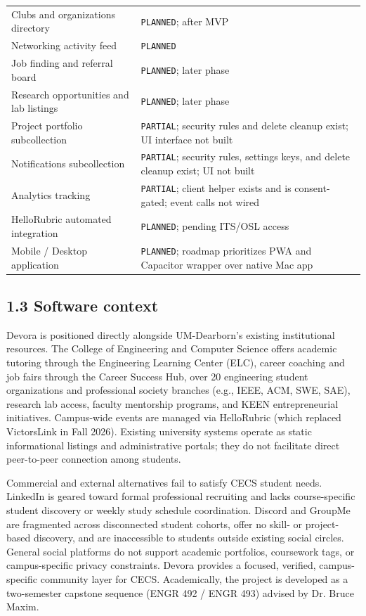 \documentclass[11pt,letterpaper]{article}
\begin{document}
\begin{table}[h!]
\begin{tabularx}{\textwidth}{l Y}
Clubs and organizations directory & \texttt{PLANNED}; after MVP \\
Networking activity feed & \texttt{PLANNED} \\
Job finding and referral board & \texttt{PLANNED}; later phase \\
Research opportunities and lab listings & \texttt{PLANNED}; later phase \\
Project portfolio subcollection & \texttt{PARTIAL}; security rules and delete cleanup exist; UI interface not built \\
Notifications subcollection & \texttt{PARTIAL}; security rules, settings keys, and delete cleanup exist; UI not built \\
Analytics tracking & \texttt{PARTIAL}; client helper exists and is consent-gated; event calls not wired \\
HelloRubric automated integration & \texttt{PLANNED}; pending ITS/OSL access \\
Mobile / Desktop application & \texttt{PLANNED}; roadmap prioritizes PWA and Capacitor wrapper over native Mac app \\
\bottomrule
\end{tabularx}
\end{table}

\subsection*{1.3 Software context}

Devora is positioned directly alongside UM-Dearborn's existing institutional resources. The College of Engineering and Computer Science offers academic tutoring through the Engineering Learning Center (ELC), career coaching and job fairs through the Career Success Hub, over 20 engineering student organizations and professional society branches (e.g., IEEE, ACM, SWE, SAE), research lab access, faculty mentorship programs, and KEEN entrepreneurial initiatives. Campus-wide events are managed via HelloRubric (which replaced VictorsLink in Fall 2026). Existing university systems operate as static informational listings and administrative portals; they do not facilitate direct peer-to-peer connection among students.

Commercial and external alternatives fail to satisfy CECS student needs. LinkedIn is geared toward formal professional recruiting and lacks course-specific student discovery or weekly study schedule coordination. Discord and GroupMe are fragmented across disconnected student cohorts, offer no skill- or project-based discovery, and are inaccessible to students outside existing social circles. General social platforms do not support academic portfolios, coursework tags, or campus-specific privacy constraints. Devora provides a focused, verified, campus-specific community layer for CECS. Academically, the project is developed as a two-semester capstone sequence (ENGR 492 / ENGR 493) advised by Dr. Bruce Maxim.
\end{document}
